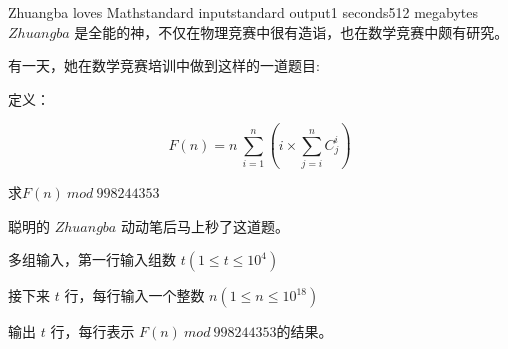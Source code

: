 \begin{problem}{Zhuangba loves Math}{standard input}{standard output}{1 seconds}{512 megabytes}
$Zhuangba$ 是全能的神，不仅在物理竞赛中很有造诣，也在数学竞赛中颇有研究。

有一天，她在数学竞赛培训中做到这样的一道题目:

定义：

$$F(n)=n \ \sum_{i=1}^{n} (i\times \sum_{j=i}^{n} C_{j}^{i})$$

求$F(n)\ mod \ 998244353$

聪明的 $Zhuangba$ 动动笔后马上秒了这道题。
\InputFile

多组输入，第一行输入组数 $t(1 \le t \le 10^{4})$ 

接下来 $t$ 行，每行输入一个整数 $n(1\le n \le 10^{18})$
\OutputFile

输出 $t$ 行，每行表示 $F(n)\ mod \ 998244353$的结果。

\Example

\begin{example}
%
\end{example}

\end{problem}
